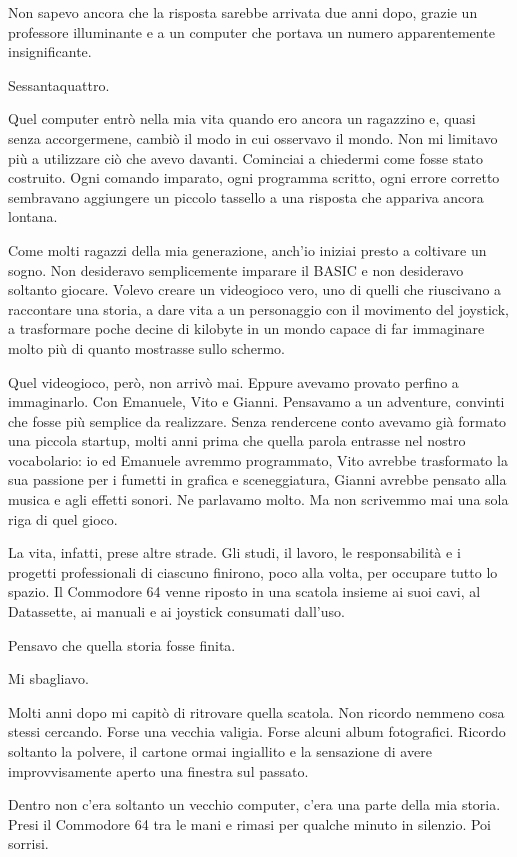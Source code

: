 \documentclass{article}
\begin{document}
Non sapevo ancora che la risposta sarebbe arrivata due anni dopo, grazie un professore illuminante e a un computer che
portava un numero apparentemente insignificante.

Sessantaquattro.

Quel computer entrò nella mia vita quando ero ancora un ragazzino e, quasi senza accorgermene, cambiò il modo in cui
osservavo il mondo. Non mi limitavo più a utilizzare ciò che avevo davanti. Cominciai a chiedermi come fosse stato
costruito. Ogni comando imparato, ogni programma scritto, ogni errore corretto sembravano aggiungere un piccolo
tassello a una risposta che appariva ancora lontana.

Come molti ragazzi della mia generazione, anch'io iniziai presto a coltivare un sogno. Non desideravo semplicemente
imparare il BASIC e non desideravo soltanto giocare. Volevo creare un videogioco vero, uno di quelli che riuscivano a
raccontare una storia, a dare vita a un personaggio con il movimento del joystick, a trasformare poche decine di
kilobyte in un mondo capace di far immaginare molto più di quanto mostrasse sullo schermo.

Quel videogioco, però, non arrivò mai. Eppure avevamo provato perfino a immaginarlo. Con Emanuele, Vito e Gianni.
Pensavamo a un adventure, convinti che fosse più semplice da realizzare. Senza rendercene conto avevamo già formato una
piccola startup, molti anni prima che quella parola entrasse nel nostro vocabolario: io ed Emanuele avremmo
programmato, Vito avrebbe trasformato la sua passione per i fumetti in grafica e sceneggiatura, Gianni avrebbe pensato
alla musica e agli effetti sonori. Ne parlavamo molto. Ma non scrivemmo mai una sola riga di quel gioco.

La vita, infatti, prese altre strade. Gli studi, il lavoro, le responsabilità e i progetti professionali di ciascuno
finirono, poco alla volta, per occupare tutto lo spazio. Il Commodore 64 venne riposto in una scatola insieme ai suoi
cavi, al Datassette, ai manuali e ai joystick consumati dall'uso.

Pensavo che quella storia fosse finita.

Mi sbagliavo.

Molti anni dopo mi capitò di ritrovare quella scatola. Non ricordo nemmeno cosa stessi cercando. Forse una vecchia
valigia. Forse alcuni album fotografici. Ricordo soltanto la polvere, il cartone ormai ingiallito e la sensazione di
avere improvvisamente aperto una finestra sul passato.

Dentro non c'era soltanto un vecchio computer, c'era una parte della mia storia. Presi il Commodore 64 tra le mani e
rimasi per qualche minuto in silenzio. Poi sorrisi.
\end{document}
